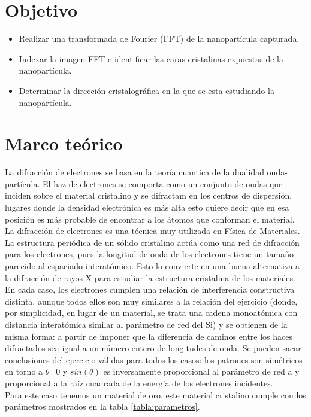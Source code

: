 \documentclass[reprint,amsmath,amssymb,aps,]{revtex4-2}
\begin{document}
\section{Objetivo}
\begin{itemize}
    \item Realizar una transformada de Fourier (FFT) de la nanopartícula capturada.
    \item Indexar la imagen FFT e identificar las caras cristalinas expuestas de la nanopartícula.
    \item Determinar la dirección cristalográfica en la que se esta estudiando la nanopartícula.
\end{itemize}
\section{Marco teórico}
La difracción de electrones se basa en la teoría cuantica de la dualidad onda-partícula. El haz de electrones se comporta como un conjunto
de ondas que inciden sobre el material cristalino y se difractam en los centros de dispersión, lugares donde la densidad electrónica es más alta
esto quiere decir que en esa posición es más probable de encontrar a los átomos que conforman el material.\\ 
La difracción de electrones es una técnica muy utilizada en Física de Materiales. La estructura periódica
de un sólido cristalino actúa como una red de difracción para los electrones, pues la longitud de onda de
los electrones tiene un tamaño parecido al espaciado interatómico. Esto lo convierte en una buena
alternativa a la difracción de rayos X para
estudiar la estructura cristalina de los
materiales. En cada caso, los electrones cumplen una relación de interferencia constructiva distinta, aunque todos
ellos son muy similares a la relación del ejercicio (donde, por simplicidad, en lugar de un material, se
trata una cadena monoatómica con distancia interatómica similar al parámetro de red del Si) y se
obtienen de la misma forma: a partir de imponer que la diferencia de caminos entre los haces
difractados sea igual a un número entero de longitudes de onda. Se pueden sacar conclusiones del
ejercicio válidas para todos los casos: los patrones son simétricos en torno a $\theta$=0 y $sin(\theta)$ es
inversamente proporcional al parámetro de red a y proporcional a la raíz cuadrada de la energía de los
electrones incidentes.\\
Para este caso tenemos un material de oro, este material cristalino cumple con los parámetros 
mostrados en la tabla \ref{tabla:parametros}.
\end{document}
